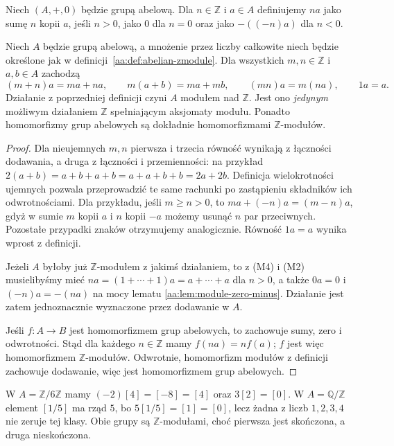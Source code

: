 \begin{definicja}
\label{aa:def:abelian-zmodule}
Niech $(A,+,0)$ będzie grupą abelową.
Dla $n\in\mathbb Z$ i $a\in A$ definiujemy $na$ jako sumę
$n$ kopii $a$, jeśli $n>0$, jako $0$ dla $n=0$ oraz jako
$-((-n)a)$ dla $n<0$.
\end{definicja}
\begin{stwierdzenie}
\label{aa:st:abelian-module-laws}
Niech $A$ będzie grupą abelową, a mnożenie przez liczby całkowite
niech będzie określone jak w definicji~\ref{aa:def:abelian-zmodule}.
Dla wszystkich $m,n\in\mathbb Z$ i $a,b\in A$ zachodzą
\[
(m+n)a=ma+na,\qquad m(a+b)=ma+mb,\qquad
(mn)a=m(na),\qquad 1a=a.
\]
Działanie z poprzedniej definicji czyni $A$ modułem nad
$\mathbb Z$. Jest ono \emph{jedynym} możliwym działaniem
$\mathbb Z$ spełniającym aksjomaty modułu. Ponadto
homomorfizmy grup abelowych są dokładnie homomorfizmami
$\mathbb Z$-modułów.
\end{stwierdzenie}
\begin{proof}
Dla nieujemnych $m,n$ pierwsza i trzecia równość wynikają
z łączności dodawania, a druga z łączności i przemienności:
na przykład $2(a+b)=a+b+a+b=a+a+b+b=2a+2b$.
Definicja wielokrotności ujemnych pozwala przeprowadzić
te same rachunki po zastąpieniu składników ich odwrotnościami.
Dla przykładu, jeśli $m\ge n>0$, to
$m a+(-n)a=(m-n)a$, gdyż w sumie $m$ kopii $a$
i $n$ kopii $-a$ możemy usunąć $n$ par przeciwnych.
Pozostałe przypadki znaków otrzymujemy analogicznie.
Równość $1a=a$ wynika wprost z definicji.

Jeżeli $A$ byłoby już $\mathbb Z$-modułem z jakimś działaniem,
to z (M4) i (M2) musielibyśmy mieć
$n a=(1+\cdots+1)a=a+\cdots+a$ dla $n>0$,
a także $0a=0$ i $(-n)a=-(na)$ na mocy lematu
\ref{aa:lem:module-zero-minus}. Działanie jest zatem
jednoznacznie wyznaczone przez dodawanie w $A$.

Jeśli $f:A\to B$ jest homomorfizmem grup abelowych,
to zachowuje sumy, zero i odwrotności. Stąd dla każdego
$n\in\mathbb Z$ mamy $f(na)=nf(a)$; $f$ jest więc
homomorfizmem $\mathbb Z$-modułów. Odwrotnie,
homomorfizm modułów z definicji zachowuje dodawanie,
więc jest homomorfizmem grup abelowych.
\end{proof}

\begin{przyklad}
W $A=\mathbb Z/6\mathbb Z$ mamy
$(-2)[4]=[-8]=[4]$ oraz $3[2]=[0]$.
W $A=\mathbb Q/\mathbb Z$ element $[1/5]$ ma rząd $5$,
bo $5[1/5]=[1]=[0]$, lecz żadna z liczb
$1,2,3,4$ nie zeruje tej klasy. Obie grupy są
$\mathbb Z$-modułami, choć pierwsza jest skończona,
a druga nieskończona.
\end{przyklad}

